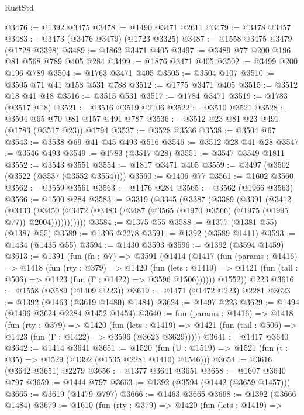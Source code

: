 \begin{lexlean}{RustStd}
\begin{coremodule}
@3476 := @1392 @3475
@3478 := @1490 @3471 @2611
@3479 := @3478 @3457
@3483 := @3473 (@3476 @3479) (@1723 @3325)
@3487 := @1558 @3475 @3479 (@1728 @3398)
@3489 := @1862 @3471 @405
@3497 := @3489 @77 @200 @196 @81 @568 @789 @405 @284
@3499 := @1876 @3471 @405
@3502 := @3499 @200 @196 @789
@3504 := @1763 @3471 @405
@3505 := @3504 @107
@3510 := @3505 @71 @41 @158 @531 @788
@3512 := @1775 @3471 @405
@3515 := @3512 @18 @41 @18
@3516 := @3515 @531
@3517 := @1784 @3471
@3519 := @1783 (@3517 @18)
@3521 := @3516 @3519 @2106
@3522 := @3510 @3521
@3528 := @3504 @65 @70 @81 @157 @491 @787
@3536 := @3512 @23 @81 @23 @491 (@1783 (@3517 @23)) @1794
@3537 := @3528 @3536
@3538 := @3504 @67
@3543 := @3538 @69 @41 @45 @493 @516
@3546 := @3512 @28 @41 @28
@3547 := @3546 @493
@3549 := @1783 (@3517 @28)
@3551 := @3547 @3549 @1811
@3552 := @3543 @3551
@3554 := @1817 @3471 @405
@3559 := @3497 (@3502 (@3522 (@3537 (@3552 @3554))))
@3560 := @1406 @77
@3561 := @1602 @3560
@3562 := @3559 @3561
@3563 := @1476 @284
@3565 := @3562 (@1966 @3563)
@3566 := @1500 @284
@3583 := @3319
    (@3345
      (@3387
        (@3389
          (@3391
            (@3412
              (@3433
                (@3450
                  (@3472 (@3483 (@3487 (@3565 (@1970 @3566) (@1975 (@1995 @77)) @2004)))))))))))
@3584 := @1375 @55
@3588 := @1377 (@1381 @55) (@1387 @55)
@3589 := @1396 @2278
@3591 := @1392 (@3589 @1411)
@3593 := @1434 (@1435 @55)
@3594 := @1430 @3593
@3596 := @1392 (@3594 @1459)
@3613 := @1391
    (fun (fn : @7) =>
    @3591
      (@1414
        (@1417
          (fun (params : @1416) =>
          @1418
            (fun (rty : @379) =>
            @1420
              (fun (lets : @1419) =>
              @1421 (fun (tail : @506) => @1423 (fun (Γ : @1422) => @3596 @1506))))))
        @1552))
    @223
@3616 := @1558 (@3589 (@1409 @223))
@3619 := @1471 (@1472 @223) @2281
@3623 := @1392 (@1463 (@3619 @1480) @1484)
@3624 := @1497 @223
@3629 := @1494 (@1496 @3624 @2284 @1452 @1454)
@3640 := fun (params : @1416) =>
  @1418
    (fun (rty : @379) =>
    @1420
      (fun (lets : @1419) =>
      @1421 (fun (tail : @506) => @1423 (fun (Γ : @1422) => @3596 (@3623 @3629)))))
@3641 := @1417 @3640
@3642 := @1414 @3641
@3651 := @1520 (fun (U : @1519) => @1521 (fun (t : @35) => @1529 (@1392 (@1535 @2281 @1410) @1546)))
@3654 := @3616 (@3642 @3651) @2279
@3656 := @1377 @3641 @3651
@3658 := @1607 @3640 @797
@3659 := @1444 @797
@3663 := @1392 (@3594 (@1442 (@3659 @1457)))
@3665 := @3619 (@1479 @797)
@3666 := @1463 @3665
@3668 := @1392 (@3666 @1484)
@3679 := @1610
    (fun (rty : @379) =>
    @1420
      (fun (lets : @1419) =>

\end{coremodule}
\end{lexlean}
